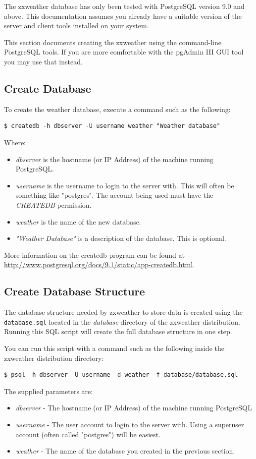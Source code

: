 \documentclass[a4paper,10pt,draft]{book}
\begin{document}
The zxweather database has only been tested with PostgreSQL version 9.0 and above. This documentation assumes you already have a suitable version of the server and client tools installed on your system.

This section documents creating the zxweather using the command-line PostgreSQL tools. If you are more comfortable with the pgAdmin III GUI tool you may use that instead.

\subsection{Create Database}
To create the weather database, execute a command such as the following:

\begin{verbatim}
$ createdb -h dbserver -U username weather "Weather database"
\end{verbatim}

Where:
\begin{itemize}
\item \emph{dbserver} is the hostname (or IP Address) of the machine running PostgreSQL.
\item \emph{username} is the username to login to the server with. This will often be something like "postgres". The account being used must have the \emph{CREATEDB} permission.
\item \emph{weather} is the name of the new database.
\item \emph{"Weather Database"} is a description of the database. This is optional.
\end{itemize}

More information on the createdb program can be found at \url{http://www.postgresql.org/docs/9.1/static/app-createdb.html}.

\subsection{Create Database Structure}
The database structure needed by zxweather to store data is created using the \verb|database.sql| located in the \emph{database} directory of the zxweather distribution. Running this SQL script will create the full database structure in one step.

You can run this script with a command such as the following inside the zxweather distribution directory:
\begin{verbatim}
$ psql -h dbserver -U username -d weather -f database/database.sql 
\end{verbatim}
The supplied parameters are:
\begin{itemize}
\item \emph{dbserver} - The hostname (or IP Address) of the machine running PostgreSQL
\item \emph{username} - The user account to login to the server with. Using a superuser account (often called "postgres") will be easiest.
\item \emph{weather} - The name of the database you created in the previous section.
\end{itemize}
\end{document}
